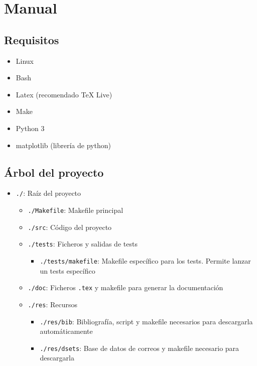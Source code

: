 \section{Manual}

\subsection{Requisitos}

\begin{itemize}
	\item Linux
	\item Bash
	\item Latex (recomendado TeX Live)
	\item Make
	\item Python 3
	\item matplotlib (librería de python)
\end{itemize}

\subsection{Árbol del proyecto}

\begin{itemize}
	\item \texttt{./}: Raíz del proyecto
	\begin{itemize}
		\item \texttt{./Makefile}: Makefile principal
		\item \texttt{./src}: Código del proyecto
		\item \texttt{./tests}: Ficheros y salidas de tests
		\begin{itemize}
			\item \texttt{./tests/makefile}: Makefile específico
				para los tests. Permite lanzar un tests
				específico
		\end{itemize}
		\item \texttt{./doc}: Ficheros \texttt{.tex} y makefile para
			generar la documentación
		\item \texttt{./res}: Recursos
		\begin{itemize}
			\item \texttt{./res/bib}: Bibliografía, script y
				makefile necesarios para descargarla
				automáticamente
			\item \texttt{./res/dsets}: Base de datos de correos y
				makefile necesario para descargarla
		\end{itemize}
	\end{itemize}
\end{itemize}

